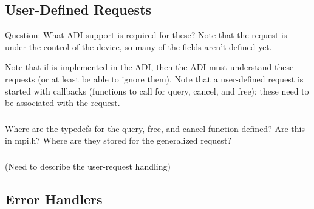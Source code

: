 \documentclass{article}
\begin{document}
\subsubsection{}

\subsubsection{}

\subsubsection{}

\subsubsection{}

\subsection{User-Defined Requests}

Question:  What ADI support is required for these?  Note that the
request is under the control of the device, so many of the fields
aren't defined yet.

Note that if  is implemented in the ADI, then the
ADI must understand these requests (or at least be able to ignore
them).
Note that a user-defined request is started with callbacks (functions
to call for query, cancel, and free); these need to be associated with
the request.  

\subsubsection{}
Where are the typedefs for the query, free, and cancel function defined? 
Are this in mpi.h?  Where are they stored for the generalized request?

\subsubsection{}

(Need to describe the user-request handling)

\subsection{Error Handlers}
\end{document}
